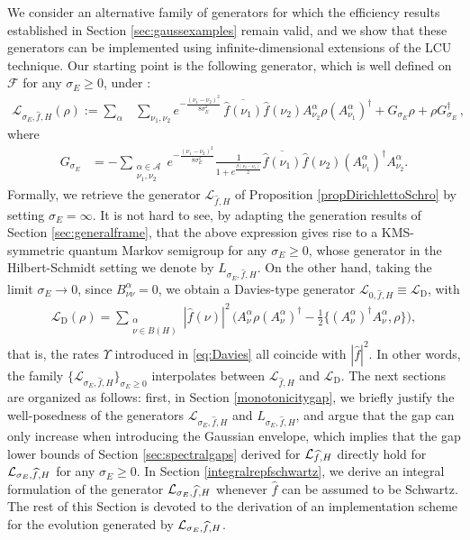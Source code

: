 \documentclass[11pt]{amsart}
\newcommand{\1}{\mathbbm{1}}
\newcommand{\cL}{\mathcal{L}}
\theoremstyle{plain}
\theoremstyle{definition}
\theoremstyle{remark}
\numberwithin{equation}{section}
\begin{document}
 We consider an alternative family of generators for which the efficiency results established in Section \ref{sec:gaussexamples} remain valid, and we show that these generators can be implemented using infinite-dimensional extensions of the LCU technique. Our starting point is the following generator, which is well defined on $\mathscr{F}$ for any $\sigma_E\ge 0$, under :
\begin{align}
\label{eq:DefLsigma_E}
\mathcal{L}_{\sigma_E,\widehat{f},H}(\rho)\!:=\!\sum_\alpha&\sum_{\nu_1,\nu_2}e^{-\frac{(\nu_1-\nu_2)^2}{8\sigma_E^2}}\,\overline{\widehat{f}(\nu_1)}\widehat{f}(\nu_2)A^\alpha_{\nu_2}\rho (A^\alpha_{\nu_1})^\dagger+G_{\sigma_E}\rho+\rho G_{\sigma_E}^\dagger\,,
\end{align}
where 
\begin{align*}
 G_{\sigma_E}
&=-\sum_{\substack{\alpha\in\mathcal{A}\\ \nu_1,\nu_2}}\!e^{-\frac{(\nu_1-\nu_2)^2}{8\sigma_E^2}}\!\!\! \frac{1}{1+e^{\frac{\beta(\nu_2-\nu_1)}{2}}}\overline{\widehat{f}(\nu_1)}\widehat{f}(\nu_2)(A^\alpha_{\nu_1})^\dagger A^\alpha_{\nu_2}.
\end{align*}
Formally, we retrieve the generator $\mathcal{L}_{\widehat{f},H}$ of Proposition \ref{propDirichlettoSchro} by setting $\sigma_E=\infty$. It is not hard to see, by adapting the generation results of Section \ref{sec:generalframe}, that the above expression gives rise to a KMS-symmetric quantum Markov semigroup for any $\sigma_E\ge0$, whose generator in the Hilbert-Schmidt setting we denote by $L_{\sigma_E,\widehat{f},H}$. On the other hand, taking the limit $\sigma_E\to 0$, since $B^\alpha_{\nu\nu}=0$,  we obtain a Davies-type generator $\mathcal{L}_{0,\widehat{f},H}\equiv \mathcal{L}_{\operatorname{D}}$, with
\begin{align}
\label{eq:DefDavies}
\mathcal{L}_{\operatorname{D}}(\rho)=\sum_{\substack{\alpha \\ \nu\in B(H)}}|\widehat{f}(\nu)|^2\,\big(A^\alpha_\nu\rho (A^\alpha_\nu)^\dagger-\frac{1}{2}\{(A^\alpha_\nu)^\dagger A^\alpha_\nu,\rho\}\big),
\end{align}
that is, the rates $\Upsilon$ introduced in \eqref{eq:Davies} all coincide with $|\widehat{f}|^2$. In other words, the family $\{\mathcal{L}_{\sigma_E,\widehat{f},H}\}_{\sigma_E\ge 0}$ interpolates between $\mathcal{L}_{\widehat{f},H}$ and $\mathcal{L}_{\operatorname{D}}$. The next sections are organized as follows: first, in Section \ref{monotonicitygap}, we briefly justify the well-posedness of the generators $\cL_{\sigma_E,\widehat{f},H}$ and $L_{\sigma_E,\widehat{f},H}$, and argue that the gap can only increase when introducing the Gaussian envelope, which implies that the gap lower bounds of Section \ref{sec:spectralgaps} derived for $\mathcal{L}_{\smash{\widehat{f},H}}$ directly hold for $\mathcal{L}_{\smash{\sigma_E,\widehat{f},H}}$ for any $\sigma_E\ge 0$. In Section \ref{integralrepfschwartz}, we derive an integral formulation of the generator $\mathcal{L}_{\smash{\sigma_E,\widehat{f},H}}$ whenever $\widehat{f}$ can be assumed to be Schwartz. The rest of this Section is devoted to the derivation of an implementation scheme for the evolution generated by $\cL_{\smash{\sigma_E,\widehat{f},H}}$.
\end{document}
